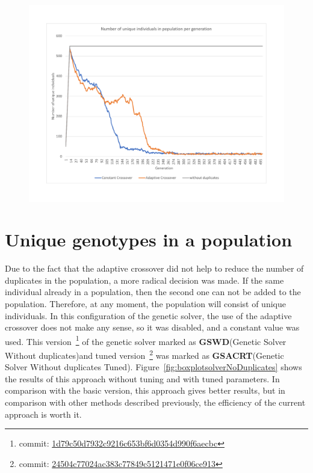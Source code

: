 \begin{figure}
	\centering
	\includegraphics[width=\textwidth]{images/UniqIndividualsPerGeneration3.pdf}
	\caption[]{}
	\label{fig:UniqIndividualsPerGeneration3}
\end{figure}                        


\section{Unique genotypes in a population}
Due to the fact that the adaptive crossover did not help to reduce the number of duplicates in the population, a more radical decision was made. If the same individual already in a population, then the second one can not be added to the population. Therefore, at any moment, the population will consist of unique individuals. In this configuration of the genetic solver, the use of the adaptive crossover does not make any sense, so it was disabled, and a constant value was used.
This version~\footnote{commit: \href{https://git-st.inf.tu-dresden.de/mquat/mquat2/commit/1d79c50d7932c9216c653bf6d0354d990f6aecbc}{1d79c50d7932c9216c653bf6d0354d990f6aecbc}} of the genetic solver marked as \textbf{GSWD}(Genetic Solver Without duplicates)and tuned version~\footnote{commit: \href{https://git-st.inf.tu-dresden.de/mquat/mquat2/commit/24504c77024ac383c77849c5121471e0f06ce913}{24504c77024ac383c77849c5121471e0f06ce913}} was marked as \textbf{GSACRT}(Genetic Solver Without duplicates Tuned).
Figure~\ref{fig:boxplotsolverNoDuplicates} shows the results of this approach without tuning and with tuned parameters. In comparison with the basic version, this approach gives better results, but in comparison with other methods described previously, the efficiency of the current approach is worth it.

